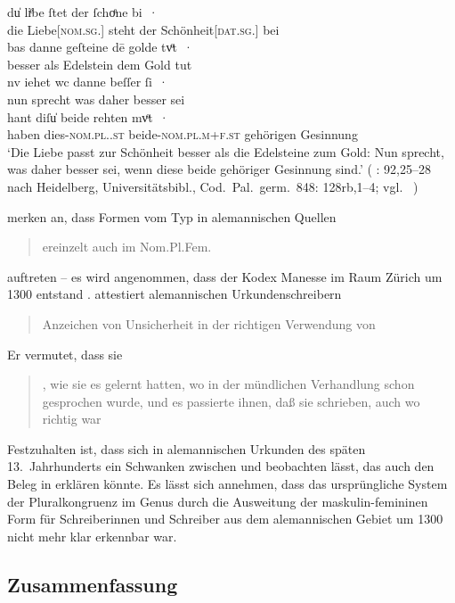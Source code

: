\begin{exe}
\ex\label{ex:walther92_25-28_C_2}
	\gll du̍ liͤbe ſtet der ſchoͤne bi~· \\
			die Liebe[\textsc{nom.sg.\FemI}] steht der
			Schönheit[\textsc{dat.sg.\FemI}] bei \\
\sn \gll bas danne geſteine dē golde tvͦt~· \\
		besser als Edelstein dem Gold tut \\
\sn \gll nv iehet wc danne beſſer ſi~· \\
		nun sprecht was daher besser sei \\
\sn \gll hant diſu̍ beide rehten mvͦt~· \\
		haben dies-\textsc{nom.pl.\NeutI.st} beide-\textsc{nom.pl.m+f\subI.st}
			gehörigen Gesinnung \\
	\trans `Die Liebe passt zur Schönheit besser als die Edelsteine zum
		Gold: Nun sprecht, was daher besser sei, wenn diese beide gehöriger
		Gesinnung sind.'
		(%
			: 92,25--28 nach
			Heidelberg, Universitätsbibl., Cod.~Pal.~germ.~848: 128rb,1--4;
			vgl.~\cite[356--358]{bein2013}%
		)
	\\
\end{exe}

\citeauthor{ksw2} merken an, dass Formen vom Typ  in
alemannischen Quellen
\blockcquote[485]{ksw2}{ereinzelt auch im Nom.Pl.Fem.} auftreten --
es wird angenommen, dass der Kodex Manesse im Raum Zürich um 1300 entstand
\autocite[4957]{hsc}.  attestiert
alemannischen Urkundenschreibern
\blockcquote[27]{deboor1976b}{Anzeichen von Unsicherheit in der richtigen
Verwendung von }. Er vermutet, dass sie
\blockcquote[28]{deboor1976b}{ , wie sie es
gelernt hatten, wo in der mündlichen Verhandlung schon  gesprochen
wurde, und es passierte ihnen, daß sie  schrieben, auch wo
 richtig war}. Festzuhalten ist, dass sich in
alemannischen Urkunden des späten 13.~Jahrhunderts
ein Schwanken zwischen  und  beobachten lässt, das auch
den Beleg in  erklären könnte. Es lässt sich
annehmen, dass das ursprüngliche System der Pluralkongruenz im Genus durch die
Ausweitung der maskulin-femininen Form für Schreiberinnen und Schreiber aus dem
alemannischen Gebiet um 1300 nicht mehr klar
erkennbar war.

\subsection{Zusammenfassung}

